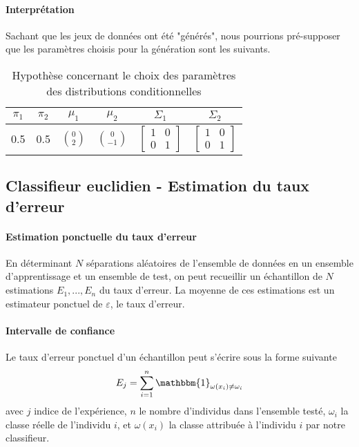 \documentclass{report}
\begin{document}
\paragraph{Interprétation}
Sachant que les jeux de données ont été "générés", nous pourrions pré-supposer que les paramètres choisis pour la génération sont les suivants.

\begin{table}[h!]
    \centering
    \caption{Hypothèse concernant le choix des paramètres des distributions conditionnelles}
    \label{tab:table1}
    \def\arraystretch{1.5}
    \begin{tabular}{c|c|c|c|c|c}
        $\pi_1$ & $\pi_2$ & $\mu_1$ & $\mu_2$ & $\Sigma_1$ & $\Sigma_2$\\
        \hline
        0.5 & 0.5 & $\binom{0}{2}$ & $\binom{0}{-1}$
        & $\begin{bmatrix} 1 & 0\\ 0 & 1 \end{bmatrix}$
        & $\begin{bmatrix} 1 & 0\\ 0 & 1 \end{bmatrix}$
        \\
    \end{tabular}
\end{table}

\subsection{Classifieur euclidien - Estimation du taux d'erreur}
\paragraph{Estimation ponctuelle du taux d'erreur}
En déterminant $N$ séparations aléatoires de l'ensemble de données en un ensemble d'apprentissage et un ensemble de test, on peut recueillir un échantillon de $N$ estimations $E_1,...,E_n$ du taux d'erreur. La moyenne de ces estimations est un estimateur ponctuel de $\varepsilon$, le taux d'erreur.

\paragraph{Intervalle de confiance}
Le taux d'erreur ponctuel d'un échantillon peut s'écrire sous la forme suivante
$$E_j = \sum_{i=1}^n{\mathbbm{1}_{\omega(x_i) \neq \omega_i}}$$
avec $j$ indice de l'expérience, $n$ le nombre d'individus dans l'ensemble testé, $\omega_i$ la classe réelle de l'individu $i$, et $\omega(x_i)$ la classe attribuée à l'individu $i$ par notre classifieur.
\end{document}
